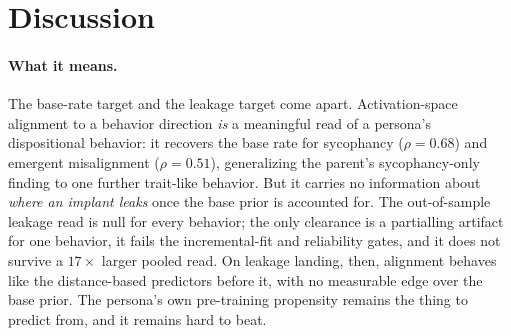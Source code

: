 \documentclass[11pt]{article}
\begin{document}
\section{Discussion}
\label{sec:discussion}

\paragraph{What it means.}
The base-rate target and the leakage target come apart. Activation-space alignment
to a behavior direction \emph{is} a meaningful read of a persona's dispositional
behavior: it recovers the base rate for sycophancy ($\rho{=}0.68$) and emergent
misalignment ($\rho{=}0.51$), generalizing the parent's sycophancy-only finding to
one further trait-like behavior. But it carries no information about \emph{where an
implant leaks} once the base prior is accounted for. The out-of-sample leakage read
is null for every behavior; the only clearance is a partialling artifact for one
behavior, it fails the incremental-fit and reliability gates, and it does not
survive a $17\times$ larger pooled read. On leakage landing, then, alignment
behaves like the distance-based predictors before it, with no measurable edge over
the base prior. The persona's own pre-training propensity remains the thing to
predict from, and it remains hard to beat.
\end{document}
